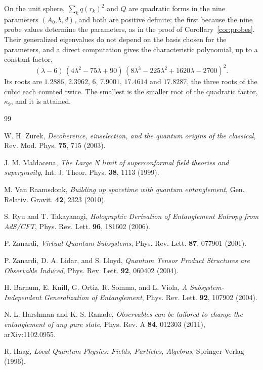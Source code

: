 \documentclass[12pt,a4paper]{article}
\begin{document}
On the unit sphere, $\sum_kq(r_k)^2$ and $Q$ are quadratic forms in the nine parameters $(A_0,b,d)$, and both are positive definite; the first because the nine probe values determine the parameters, as in the proof of Corollary~\ref{cor:probes}. Their generalized eigenvalues do not depend on the basis chosen for the parameters, and a direct computation gives the characteristic polynomial, up to a constant factor,
\[
(\lambda-6)\,(4\lambda^2-75\lambda+90)\,(8\lambda^3-225\lambda^2+1620\lambda-2700)^2 .
\]
Its roots are $1.2886$, $2.3962$, $6$, $7.9001$, $17.4614$ and $17.8287$, the three roots of the cubic each counted twice. The smallest is the smaller root of the quadratic factor, $\kappa_9$, and it is attained. 

\begin{thebibliography}{99}

W. H. Zurek, \emph{Decoherence, einselection, and the quantum origins of the classical}, Rev. Mod. Phys. \textbf{75}, 715 (2003).

J. M. Maldacena, \emph{The Large N limit of superconformal field theories and supergravity}, Int. J. Theor. Phys. \textbf{38}, 1113 (1999).

M. Van Raamsdonk, \emph{Building up spacetime with quantum entanglement}, Gen. Relativ. Gravit. \textbf{42}, 2323 (2010).

S. Ryu and T. Takayanagi, \emph{Holographic Derivation of Entanglement Entropy from AdS/CFT}, Phys. Rev. Lett. \textbf{96}, 181602 (2006).

P. Zanardi, \emph{Virtual Quantum Subsystems}, Phys. Rev. Lett. \textbf{87}, 077901 (2001).

P. Zanardi, D. A. Lidar, and S. Lloyd, \emph{Quantum Tensor Product Structures are Observable Induced}, Phys. Rev. Lett. \textbf{92}, 060402 (2004).

H. Barnum, E. Knill, G. Ortiz, R. Somma, and L. Viola, \emph{A Subsystem-Independent Generalization of Entanglement}, Phys. Rev. Lett. \textbf{92}, 107902 (2004).

N. L. Harshman and K. S. Ranade, \emph{Observables can be tailored to change the entanglement of any pure state}, Phys. Rev. A \textbf{84}, 012303 (2011), arXiv:1102.0955.

R. Haag, \emph{Local Quantum Physics: Fields, Particles, Algebras}, Springer-Verlag (1996).


\end{thebibliography}
\end{document}
